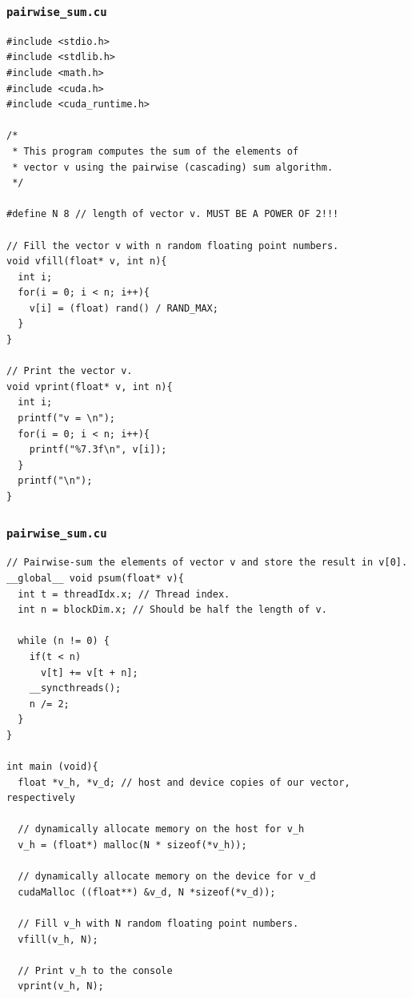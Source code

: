 \documentclass[handout]{beamer}
\numberwithin{equation}{section}
\begin{document}
\begin{frame}[fragile]
\frametitle{{\tt pairwise\_sum.cu}}\lstset{basicstyle=\tiny}
\begin{lstlisting}[name=psum]
#include <stdio.h> 
#include <stdlib.h> 
#include <math.h>
#include <cuda.h>
#include <cuda_runtime.h> 

/*
 * This program computes the sum of the elements of 
 * vector v using the pairwise (cascading) sum algorithm.
 */

#define N 8 // length of vector v. MUST BE A POWER OF 2!!!

// Fill the vector v with n random floating point numbers.
void vfill(float* v, int n){
  int i;
  for(i = 0; i < n; i++){
    v[i] = (float) rand() / RAND_MAX;
  }
}

// Print the vector v.
void vprint(float* v, int n){
  int i;
  printf("v = \n");
  for(i = 0; i < n; i++){
    printf("%7.3f\n", v[i]);
  }
  printf("\n");
}
\end{lstlisting}
\end{frame}


\begin{frame}[fragile]
\frametitle{{\tt pairwise\_sum.cu}} \lstset{basicstyle=\tiny}
\begin{lstlisting}[name=psum]
// Pairwise-sum the elements of vector v and store the result in v[0]. 
__global__ void psum(float* v){ 
  int t = threadIdx.x; // Thread index.
  int n = blockDim.x; // Should be half the length of v.

  while (n != 0) {
    if(t < n)
      v[t] += v[t + n];  
    __syncthreads();    
    n /= 2; 
  }
}

int main (void){ 
  float *v_h, *v_d; // host and device copies of our vector, respectively
  
  // dynamically allocate memory on the host for v_h
  v_h = (float*) malloc(N * sizeof(*v_h)); 
  
  // dynamically allocate memory on the device for v_d
  cudaMalloc ((float**) &v_d, N *sizeof(*v_d)); 
  
  // Fill v_h with N random floating point numbers.
  vfill(v_h, N);
  
  // Print v_h to the console
  vprint(v_h, N);
\end{lstlisting}
\end{frame}
\end{document}
